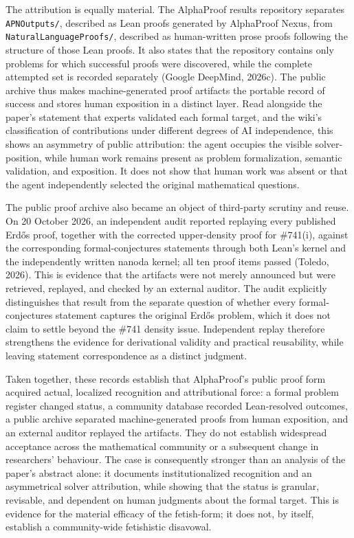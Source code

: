 \documentclass[pdflatex,sn-apa]{sn-jnl}
\begin{document}
The attribution is equally material. The AlphaProof results repository separates \texttt{APNOutputs/}, described as Lean proofs generated by AlphaProof Nexus, from \texttt{NaturalLanguageProofs/}, described as human-written prose proofs following the structure of those Lean proofs. It also states that the repository contains only problems for which successful proofs were discovered, while the complete attempted set is recorded separately (Google DeepMind, 2026c). The public archive thus makes machine-generated proof artifacts the portable record of success and stores human exposition in a distinct layer. Read alongside the paper's statement that experts validated each formal target, and the wiki's classification of contributions under different degrees of AI independence, this shows an asymmetry of public attribution: the agent occupies the visible solver-position, while human work remains present as problem formalization, semantic validation, and exposition. It does not show that human work was absent or that the agent independently selected the original mathematical questions.

The public proof archive also became an object of third-party scrutiny and reuse. On 20 October 2026, an independent audit reported replaying every published Erdős proof, together with the corrected upper-density proof for \#741(i), against the corresponding formal-conjectures statements through both Lean's kernel and the independently written nanoda kernel; all ten proof items passed (Toledo, 2026). This is evidence that the artifacts were not merely announced but were retrieved, replayed, and checked by an external auditor. The audit explicitly distinguishes that result from the separate question of whether every formal-conjectures statement captures the original Erdős problem, which it does not claim to settle beyond the \#741 density issue. Independent replay therefore strengthens the evidence for derivational validity and practical reusability, while leaving statement correspondence as a distinct judgment.

Taken together, these records establish that AlphaProof's public proof form acquired actual, localized recognition and attributional force: a formal problem register changed status, a community database recorded Lean-resolved outcomes, a public archive separated machine-generated proofs from human exposition, and an external auditor replayed the artifacts. They do not establish widespread acceptance across the mathematical community or a subsequent change in researchers' behaviour. The case is consequently stronger than an analysis of the paper's abstract alone: it documents institutionalized recognition and an asymmetrical solver attribution, while showing that the status is granular, revisable, and dependent on human judgments about the formal target. This is evidence for the material efficacy of the fetish-form; it does not, by itself, establish a community-wide fetishistic disavowal.
\end{document}
